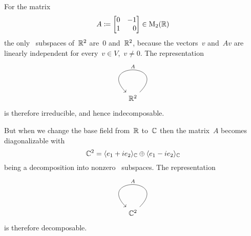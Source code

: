 \subsection{}

For the matrix
\[
  A
  \defined
  \begin{bmatrix*}[r]
    0 & -1  \\
    1 &  0
  \end{bmatrix*}
  \in
  \mat{2}{\Real}
\]
the only~ subspaces of~$\mathbb{R}^2$ are~$0$ and~$\mathbb{R}^2$, because the vectors~$v$ and~$Av$ are linearly independent for every~$v \in V$,~$v \neq 0$.
The representation
\[
  \begin{tikzcd}
    \Real^2
    \arrow[loop]{r}[above]{A}
  \end{tikzcd}
\]
is therefore irreducible, and hence indecomposable.

But when we change the base field from~$\mathbb{R}$ to~$\mathbb{C}$ then the matrix~$A$ becomes diagonalizable with
\[
    \mathbb{C}^2
  = \langle e_1 + i e_2 \rangle_{\mathbb{C}}
    \oplus
    \langle e_1 - i e_2 \rangle_{\mathbb{C}}
\]
being a decomposition into nonzero~ subspaces.
The representation
\[
  \begin{tikzcd}
    \Complex^2
    \arrow[loop]{r}[above]{A}
  \end{tikzcd}
\]
is therefore decomposable.


